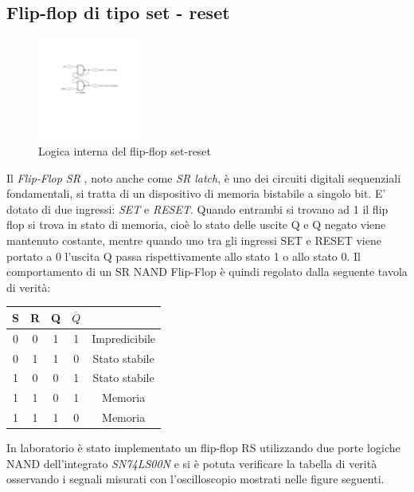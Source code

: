 \documentclass[journal]{IEEEtran}
\begin{document}
\subsection{Flip-flop di tipo set - reset}
\begin{figure}[H]%
\begin{center}
\includegraphics[width=0.30\textwidth]{sch-simulations/digital/output/flip-flop-RS.pdf}
\caption{Logica interna del flip-flop set-reset}
\label{fig:circuit_flip_flop}
\end{center}
\end{figure}
Il \textit{Flip-Flop SR }, noto  anche come \textit{SR latch}, è uno dei circuiti digitali sequenziali fondamentali, si tratta di un dispositivo di memoria bistabile a singolo bit. E' dotato di due ingressi: \textit{SET} e \textit{RESET}. Quando entrambi si trovano ad 1 il flip flop si trova in stato di memoria, cioè lo stato delle uscite Q e Q negato viene mantenuto costante, mentre quando uno tra gli ingressi SET e RESET viene portato a 0 l'uscita Q passa rispettivamente allo stato 1 o allo stato 0.
Il comportamento di un SR NAND Flip-Flop è quindi regolato dalla seguente tavola di verità:
\begin{center}
\begin{tabular}{ |c|c|c|c|c| } 
 \hline
 \rowcolor{lightgray}
S & R & Q & $\overline{Q}$ &\\ \hline \hline
 0 & 0 & 1 & 1 & Impredicibile\\  \hline
 0 & 1 & 1 & 0 & Stato stabile\\ \hline
 1 & 0 & 0 & 1 & Stato stabile\\ \hline
 1 & 1 & 0 & 1 & Memoria\\ \hline
 1 & 1 & 1 & 0 & Memoria\\ \hline
 
 \hline
\end{tabular}
\end{center}

In laboratorio è stato implementato un flip-flop RS utilizzando due porte logiche NAND dell'integrato \textit{SN74LS00N} e si è potuta verificare la tabella di verità osservando i segnali misurati con l'oscilloscopio mostrati nelle figure seguenti.
\end{document}
